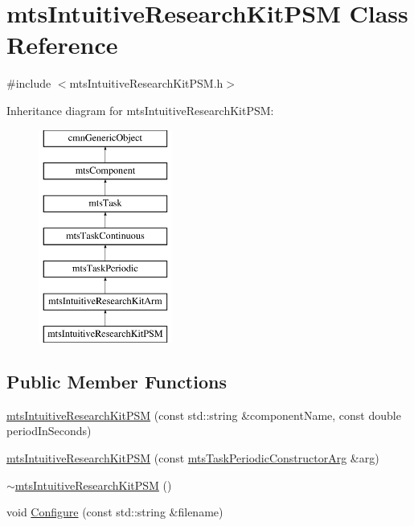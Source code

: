 \hypertarget{classmts_intuitive_research_kit_p_s_m}{\section{mts\-Intuitive\-Research\-Kit\-P\-S\-M Class Reference}
\label{classmts_intuitive_research_kit_p_s_m}
}


{\ttfamily \#include $<$mts\-Intuitive\-Research\-Kit\-P\-S\-M.\-h$>$}

Inheritance diagram for mts\-Intuitive\-Research\-Kit\-P\-S\-M\-:\begin{figure}[H]
\begin{center}
\leavevmode
\includegraphics[height=7.000000cm]{df/d79/classmts_intuitive_research_kit_p_s_m}
\end{center}
\end{figure}
\subsection*{Public Member Functions}
\begin{DoxyCompactItemize}
\item 
\hyperlink{classmts_intuitive_research_kit_p_s_m_abef5e73e7971661533b1c3c35a7daae7}{mts\-Intuitive\-Research\-Kit\-P\-S\-M} (const std\-::string \&component\-Name, const double period\-In\-Seconds)
\item 
\hyperlink{classmts_intuitive_research_kit_p_s_m_abdb3056c2b2bfda1c686969feba67809}{mts\-Intuitive\-Research\-Kit\-P\-S\-M} (const \hyperlink{classmts_task_periodic_constructor_arg}{mts\-Task\-Periodic\-Constructor\-Arg} \&arg)
\item 
\hyperlink{classmts_intuitive_research_kit_p_s_m_a06c160ea5e424740296d597fab60ad36}{$\sim$mts\-Intuitive\-Research\-Kit\-P\-S\-M} ()
\item 
void \hyperlink{classmts_intuitive_research_kit_p_s_m_a91fa93ae27dc0d525e7fac2afbe1ff95}{Configure} (const std\-::string \&filename)
\end{DoxyCompactItemize}
